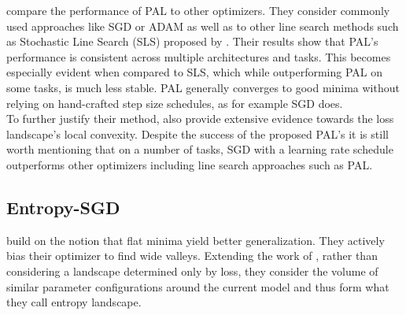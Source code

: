 \documentclass[a4paper]{scrartcl}
\begin{document}
\cite{mutschler2020parabolic} compare the performance of PAL to other optimizers. They consider commonly used approaches like SGD or ADAM as well as to other line search methods such as Stochastic Line Search (SLS) proposed by \cite{paquette2018stochastic}. Their results show that PAL's performance is consistent across multiple architectures and tasks. This becomes especially evident when compared to SLS, which while outperforming PAL on some tasks, is much less stable. PAL generally converges to good minima without relying on hand-crafted step size schedules, as for example SGD does.\\
To further justify their method, \cite{mutschler2020parabolic} also provide extensive evidence towards the loss landscape's local convexity. Despite the success of the proposed PAL's it is still worth mentioning that on a number of tasks, SGD with a learning rate schedule outperforms other optimizers including line search approaches such as PAL.



\subsection*{Entropy-SGD}
\cite{chaudhari2019entropy} build on the notion that flat minima yield better generalization. They actively bias their optimizer to find wide valleys. Extending the work of \cite{baldassi2016unreasonable}, rather than considering a landscape determined only by loss, they consider the volume of similar parameter configurations around the current model and thus form what they call entropy landscape.
\end{document}
